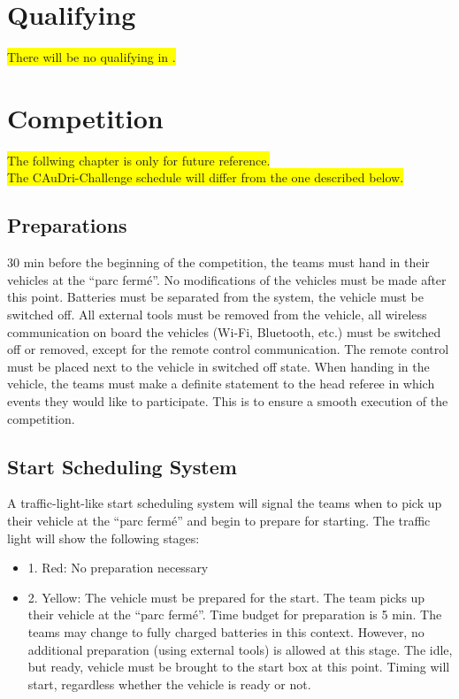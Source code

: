 \documentclass[a4paper]{report}
\begin{document}
{{\section{Qualifying}

\colorbox{yellow}{There will be no qualifying in \the\year{}.} 

\section{Competition} 

\colorbox{yellow}{The follwing chapter is only for future reference.}\\ 
\colorbox{yellow}{The \the\year{} CAuDri-Challenge schedule will differ from the one described below.}

\subsection{Preparations} 

30 min before the beginning of the competition, the teams must hand in their vehicles at the “parc fermé”. No modifications of the vehicles must be made after this point. Batteries must be separated from the system, the vehicle must be switched off. All external tools must be removed from the vehicle, all wireless communication on board the vehicles (Wi-Fi, Bluetooth, etc.) must be switched off or removed, except for the remote control communication. The remote control must be placed next to the vehicle in switched off state. When handing in the vehicle, the teams must make a definite statement to the head referee in which events they would like to participate. This is to ensure a smooth execution of the competition. 

\subsection{Start Scheduling System}
\label{start_scheduling}

A traffic-light-like start scheduling system will signal the teams when to pick up their vehicle at the “parc fermé” and begin to prepare for starting. The traffic light will show the following stages: 

\begin{itemize}
\item 1. Red: No preparation necessary 

\item 2. Yellow: The vehicle must be prepared for the start. The team picks up their vehicle at the “parc fermé”. Time budget for preparation is 5 min. The teams may change to fully charged batteries in this context. However, no additional preparation (using external tools) is allowed at this stage. The idle, but ready, vehicle must be brought to the start box at this point. Timing will start, regardless whether the vehicle is ready or not. 


\end{itemize}}}
\end{document}
